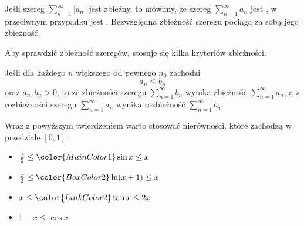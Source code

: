 Jeśli szereg $\sum_{n=1}^\infty |a_n|$ jest zbieżny, to mówimy, że szereg $\sum_{n=1}^\infty a_n$ jest , w przeciwnym przypadku jest . Bezwzględna zbieżność szeregu pociąga za sobą jego zbieżność.

Aby sprawdzić zbieżność szeregów, stosuje się kilka kryteriów zbieżności.

\begin{theorem}
    Jeśli dla każdego $n$ większego od pewnego $n_0$ zachodzi
    \[ a_n \leq b_n \]
    oraz $a_n, b_n > 0$, to ze zbieżności szeregu $\sum_{n=1}^\infty b_n$ wynika zbieżność $\sum_{n=1}^\infty a_n$, a z rozbieżności szeregu $\sum_{n=1}^\infty a_n$ wynika rozbieżność $\sum_{n=1}^\infty b_n$.
\end{theorem}

\begin{remark*}
    \begin{multicols}{2}
    Wraz z powyższym twierdzeniem warto stosować nierówności, które zachodzą w przedziale $[0,1]$:
    \begin{itemize}
        \item $\frac{x}{2} \leq {\color{MainColor1} \sin{x}} \leq x$
        \item $\frac{x}{2} \leq {\color{BoxColor2} \ln(x + 1)} \leq x$
        \item $x \leq {\color{LinkColor2} \tan{x}} \leq 2x$
        \item $1 - x \leq \cos{x}$
    \end{itemize}
    \hspace{2em}

    \end{multicols}
\end{remark*}

